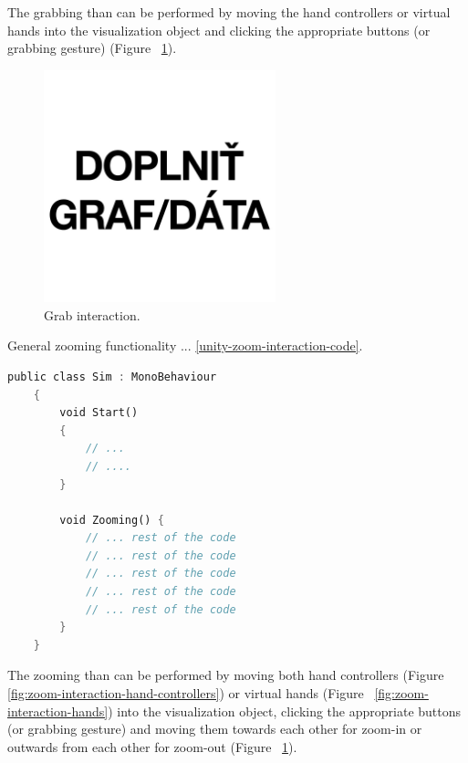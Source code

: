 The grabbing than can be performed by moving the hand controllers or virtual hands into the visualization object and clicking the appropriate buttons (or grabbing gesture) (Figure~ \ref{fig:grab-interaction}).

\begin{figure}[!ht]
	\centering
	\includegraphics[width=0.6\textwidth]{figures/empty.jpg}
	\caption{Grab interaction.}
	\label{fig:grab-interaction}
\end{figure}

General zooming functionality ... \ref{unity-zoom-interaction-code}.

\begin{lstlisting}[language=Rust, caption="Zooming interaction code.", label=unity-zoom-interaction-code]
	public class Sim : MonoBehaviour
	{
		void Start()
		{
			// ...
			// ....
		}
		
		void Zooming() {
			// ... rest of the code
			// ... rest of the code
			// ... rest of the code
			// ... rest of the code
			// ... rest of the code
		}
	}
\end{lstlisting}

The zooming than can be performed by moving both hand controllers (Figure~ \ref{fig:zoom-interaction-hand-controllers}) or virtual hands (Figure~ \ref{fig:zoom-interaction-hands}) into the visualization object,  clicking the appropriate buttons (or grabbing gesture) and moving them towards each other for zoom-in or outwards from each other for zoom-out (Figure~ \ref{fig:grab-interaction}).

